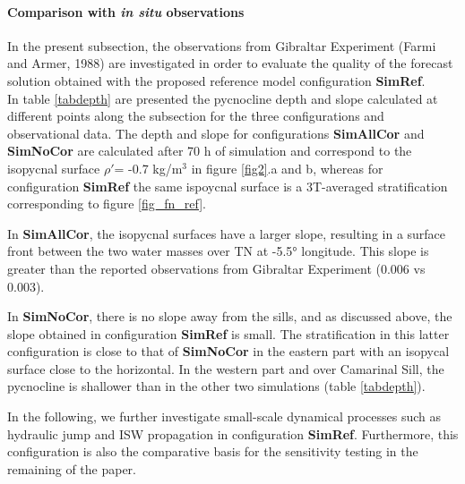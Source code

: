 \paragraph{Comparison with \textit{in situ} observations}
\label{refobs}
\indent In the present subsection, the observations from Gibraltar Experiment (Farmi and Armer, 1988) are investigated in order to evaluate the quality of the forecast solution obtained with the proposed reference model configuration \textbf{SimRef}.\\
In table \ref{tabdepth} %
are presented the pycnocline depth and slope calculated at different points along the subsection for the three configurations and observational data. The depth and slope for configurations \textbf{SimAllCor} and \textbf{SimNoCor} are calculated after 70 h of simulation and correspond to the isopycnal surface $\rho'$= -0.7 kg/m$^3$ in figure \ref{fig2}.a and b, whereas for configuration \textbf{SimRef} the same ispoycnal surface is a 3T-averaged stratification corresponding to figure \ref{fig_fn_ref}. 

In \textbf{SimAllCor}, the isopycnal surfaces have a larger slope, resulting in a surface front between the two water masses over TN at -5.5° longitude. This slope is greater than the reported observations from Gibraltar Experiment (0.006 vs 0.003).

In \textbf{SimNoCor}, there is no slope away from the sills, and as discussed above, the slope obtained in configuration \textbf{SimRef} is small. The stratification in this latter configuration is close to that of \textbf{SimNoCor} in the eastern part with an isopycal surface close to the horizontal. In the western part and over Camarinal Sill, the pycnocline is shallower than in the other two simulations (table \ref{tabdepth}).

In the following, we further investigate small-scale dynamical processes such as hydraulic jump and ISW propagation in configuration \textbf{SimRef}. Furthermore, this configuration is also the comparative basis for the sensitivity testing in the remaining of the paper.

